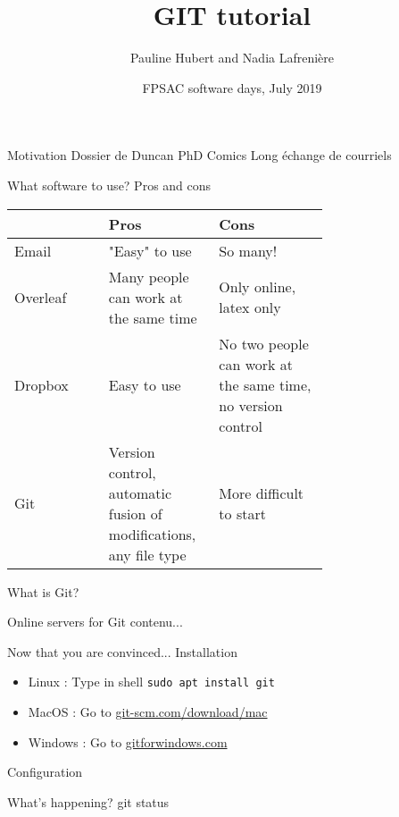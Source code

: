 \documentclass{beamer}
\title{GIT tutorial}
\author{Pauline Hubert and Nadia Lafrenière}
\date{FPSAC software days, July 2019}
\begin{document}
	\maketitle
	\begin{frame}{Motivation}
		Dossier de Duncan
		\pause
		PhD Comics
		\pause
		Long échange de courriels
	\end{frame}
	\begin{frame}{What software to use? Pros and cons}
		\begin{tabular}{lp{0.35\linewidth}p{0.35\linewidth}}
			& Pros & Cons\\
			\hline
			Email & "Easy" to use & So many!\\
			\hline
			Overleaf & Many people can work at the same time & Only online, latex only\\
			\hline
			Dropbox & Easy to use & No two people can work at the same time, no version control\\
			\hline
			Git & Version control, automatic fusion of modifications, any file type & More difficult to start\\
		\end{tabular}
	\end{frame}
	\begin{frame}{What is Git?}
		
	\end{frame}
	\begin{frame}{Online servers for Git}
		contenu...
	\end{frame}
	\begin{frame}{Now that you are convinced... Installation}
		\begin{itemize}
			\item Linux : Type in shell \texttt{sudo apt install git}
			\item MacOS : Go to \url{git-scm.com/download/mac}
			\item Windows : Go to \url{gitforwindows.com}
		\end{itemize}
	\end{frame}
	\begin{frame}{Configuration}
	\end{frame}
	\begin{frame}{What's happening?}
		git status
	\end{frame}
\end{document}
